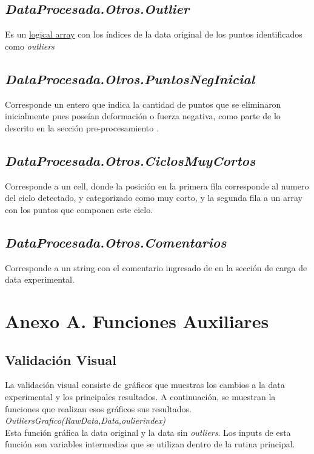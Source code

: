 \documentclass[a4paper, 11pt,article,oneside]{memoir}%
\begin{document}
\section{\textit{DataProcesada.Otros.Outlier}}
Es un \href{https://www.mathworks.com/help/matlab/logical-operations.html}{logical array} con los índices de la data original de los puntos identificados como \textit{outliers}
\section{\textit{DataProcesada.Otros.PuntosNegInicial}}
Corresponde  un entero que indica la cantidad de puntos que se eliminaron inicialmente pues poseían deformación o fuerza negativa, como parte de lo descrito en la sección pre-procesamiento .
\section{\textit{DataProcesada.Otros.CiclosMuyCortos}}
Corresponde a un cell, donde la posición en la primera fila corresponde al numero del ciclo detectado, y categorizado como muy corto, y la segunda fila a  un array con los  puntos que componen este ciclo.
\section{\textit{DataProcesada.Otros.Comentarios}}
Corresponde a un string con el comentario ingresado de en la sección de carga de data experimental.
\newpage









\chapter{Anexo A. Funciones Auxiliares}
\section*{Validación Visual}
La validación visual consiste de gráficos que muestras los cambios a la data experimental y los principales resultados. A continuación, se muestran la funciones que realizan esos gráficos sus resultados.\\

 \textit{OutliersGrafico(RawData,Data,oulierindex)}\\
    Esta función gráfica la data original y la data sin \textit{outliers}. Los inputs de esta función son variables intermedias que se utilizan dentro de la rutina principal.\\
    
\end{document}
